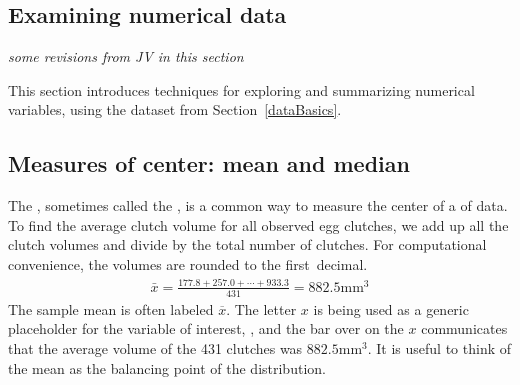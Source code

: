 \begin{doublespace}

\section[Examining numerical data]{Examining numerical data}
\label{numericalData}

\textit{some revisions from JV in this section}

This section introduces techniques for exploring and summarizing numerical variables, using the  dataset from Section~\ref{dataBasics}.



\subsection{Measures of center: mean and median}
\label{measuresOfCenterAndSpread}

The , sometimes called the , is a common way to measure the center of a  of data. To find the average clutch volume for all observed egg clutches, we add up all the clutch volumes and divide by the total number of clutches. For computational convenience, the volumes are rounded to the first~decimal.
\begin{eqnarray}
\bar{x} = \frac{177.8 + 257.0 + \cdots + 933.3}{431} = 882.5 \textrm{mm}^{3}
\label{sampleMeanEquation}
\end{eqnarray}
The sample mean is often labeled $\overline{x}$. The letter $x$ is being used as a generic placeholder for the variable of interest, , and the bar over on the $x$ communicates that the average volume of the 431 clutches was $882.5\textrm{mm}^{3}$. It is useful to think of the mean as the balancing point of the distribution. 


\end{doublespace}
